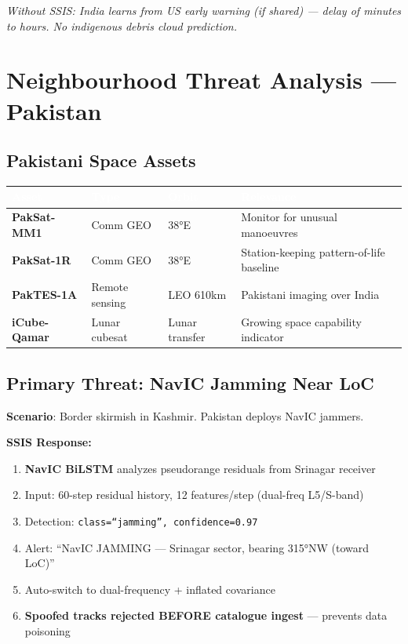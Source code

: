 \documentclass[11pt,a4paper]{article}
\newcommand{\TH}[1]{\textcolor{white}{\textbf{#1}}}
\begin{document}
\textit{Without SSIS: India learns from US early warning (if shared) --- delay of minutes to hours. No indigenous debris cloud prediction.}

\newpage
\section{Neighbourhood Threat Analysis --- Pakistan}

\subsection{Pakistani Space Assets}

\begin{table}[H]\centering\small
\begin{tabularx}{\textwidth}{|p{2.8cm}|p{2.5cm}|p{2.5cm}|X|}
\hline
\rowcolor{dblue}\TH{Asset} & \TH{Type} & \TH{Orbit} & \TH{Relevance} \\
\hline
\textbf{PakSat-MM1} & Comm GEO & 38°E & Monitor for unusual manoeuvres \\
\hline
\textbf{PakSat-1R} & Comm GEO & 38°E & Station-keeping pattern-of-life baseline \\
\hline
\textbf{PakTES-1A} & Remote sensing & LEO 610km & Pakistani imaging over India \\
\hline
\textbf{iCube-Qamar} & Lunar cubesat & Lunar transfer & Growing space capability indicator \\
\hline
\end{tabularx}
\end{table}

\subsection{Primary Threat: NavIC Jamming Near LoC}

\textbf{Scenario}: Border skirmish in Kashmir. Pakistan deploys NavIC jammers.

\textbf{SSIS Response:}
\begin{enumerate}[noitemsep]
  \item \textbf{NavIC BiLSTM} analyzes pseudorange residuals from Srinagar receiver
  \item Input: 60-step residual history, 12 features/step (dual-freq L5/S-band)
  \item Detection: \texttt{class=``jamming'', confidence=0.97}
  \item Alert: ``NavIC JAMMING --- Srinagar sector, bearing 315°NW (toward LoC)''
  \item Auto-switch to dual-frequency + inflated covariance
  \item \textbf{Spoofed tracks rejected BEFORE catalogue ingest} --- prevents data poisoning
\end{enumerate}
\end{document}
